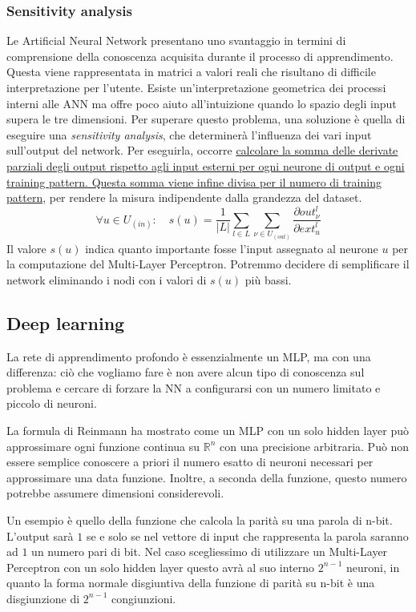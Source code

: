 \subsubsection{Sensitivity analysis}
Le Artificial Neural Network presentano uno svantaggio in termini di comprensione della conoscenza acquisita durante il processo di apprendimento. Questa viene rappresentata in matrici a valori reali che risultano di difficile interpretazione per l'utente. Esiste un'interpretazione geometrica dei processi interni alle ANN ma offre poco aiuto all'intuizione quando lo spazio degli input supera le tre dimensioni. Per superare questo problema, una soluzione è quella di eseguire una \textit{sensitivity analysis}, che determinerà l'influenza dei vari input sull'output del network. Per eseguirla, occorre \uline{calcolare la somma delle derivate parziali degli output rispetto agli input esterni per ogni neurone di output e ogni training pattern. Questa somma viene infine divisa per il numero di training pattern}, per rendere la misura indipendente dalla grandezza del dataset.
$$\forall u \in U_{(in)}: \quad s(u) = \frac{1}{|L|} \sum_{l \in L} \sum_{\nu \in U_{(out)}} \frac{\partial out_\nu^l}{\partial ext_u^l}$$
Il valore $s(u)$ indica quanto importante fosse l’input assegnato al neurone $u$ per la computazione del Multi-Layer Perceptron. Potremmo decidere di semplificare il network eliminando i nodi con i valori di $s(u)$ più bassi.

\subsection{Deep learning}
La rete di apprendimento profondo è essenzialmente un MLP, ma con una differenza: ciò che vogliamo fare è non avere alcun tipo di conoscenza sul problema e cercare di forzare la NN a configurarsi con un numero limitato e piccolo di neuroni. 

La formula di Reinmann ha mostrato come un MLP con un solo hidden layer può approssimare ogni funzione continua su $\mathbb{R}^n$ con una precisione arbitraria. Può non essere semplice conoscere a priori il numero esatto di neuroni necessari per approssimare una data funzione. Inoltre, a seconda della funzione, questo numero potrebbe assumere dimensioni considerevoli. 

Un esempio è quello della funzione che calcola la parità su una parola di n-bit. L’output sarà $1$ se e solo se nel vettore di input che rappresenta la parola saranno ad $1$ un numero pari di bit. Nel caso scegliessimo di utilizzare un Multi-Layer Perceptron con un solo hidden layer questo avrà al suo interno $2^{n-1}$ neuroni, in quanto la forma normale disgiuntiva della funzione di parità su n-bit è una disgiunzione di $2^{n-1}$ congiunzioni. 

